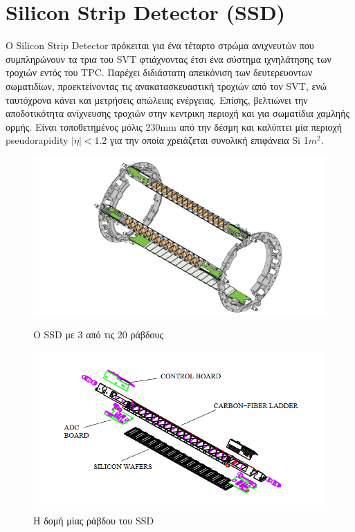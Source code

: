 \section{Silicon Strip Detector (SSD)}

O Silicon Strip Detector πρόκειται για ένα τέταρτο στρώμα ανιχνευτών που συμπληρώνουν τα τρια του SVT φτιάχνοντας έτσι ένα σύστημα ιχνηλάτησης των τροχιών εντός του TPC.
	Παρέχει διδιάστατη απεικόνιση των δευτερευοντων σωματιδίων, προεκτείνοντας τις ανακατασκευαστική τροχιών από τον SVT, ενώ ταυτόχρονα κάνει και μετρήσεις απώλειας ενέργειας. Επίσης, βελτιώνει την αποδοτικότητα ανίχνευσης τροχιών στην κεντρικη περιοχή και για σωματίδια χαμληής ορμής.
	Είναι τοποθετημένος μόλις 230mm από την δέσμη και καλύπτει μία περιοχή pseudorapidity $|\eta|<1.2$ για την οποία χρειάζεται συνολική επιφάνεια Si 1$m^2$.
		
	
		\begin{figure}[h!]
    \centering
    \begin{minipage}{.5\textwidth}
        \centering
        \includegraphics[width=0.9\linewidth, height=0.25\textheight]{STAR_Detectors/SSD_full}
        \caption{Ο SSD με 3 από τις 20 ράβδους}
        \label{fig3.16}
    \end{minipage}%
    \begin{minipage}{0.5\textwidth}
        \centering
        \includegraphics[width=0.9\linewidth, height=0.25\textheight]{STAR_Detectors/SSD_ladder}
        \caption{Η δομή μίας ράβδου του SSD}
        \label{fig3.17}
    \end{minipage}
\end{figure}

